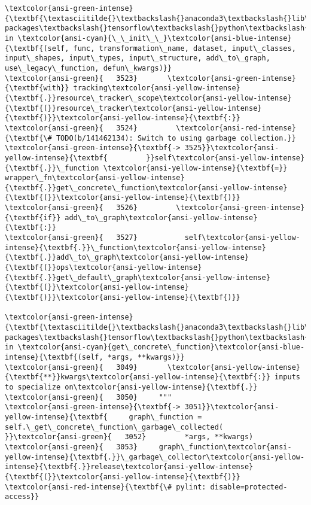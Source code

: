 \documentclass[11pt]{article}
\begin{document}
\begin{Verbatim}[commandchars=\\\{\}, frame=single, framerule=2mm, rulecolor=\color{outerrorbackground}]
\textcolor{ansi-green-intense}{\textbf{\textasciitilde{}\textbackslash{}anaconda3\textbackslash{}lib\textbackslash{}site-packages\textbackslash{}tensorflow\textbackslash{}python\textbackslash{}data\textbackslash{}ops\textbackslash{}dataset\_ops.py}} in \textcolor{ansi-cyan}{\_\_init\_\_}\textcolor{ansi-blue-intense}{\textbf{(self, func, transformation\_name, dataset, input\_classes, input\_shapes, input\_types, input\_structure, add\_to\_graph, use\_legacy\_function, defun\_kwargs)}}
\textcolor{ansi-green}{   3523}       \textcolor{ansi-green-intense}{\textbf{with}} tracking\textcolor{ansi-yellow-intense}{\textbf{.}}resource\_tracker\_scope\textcolor{ansi-yellow-intense}{\textbf{(}}resource\_tracker\textcolor{ansi-yellow-intense}{\textbf{)}}\textcolor{ansi-yellow-intense}{\textbf{:}}
\textcolor{ansi-green}{   3524}         \textcolor{ansi-red-intense}{\textbf{\# TODO(b/141462134): Switch to using garbage collection.}}
\textcolor{ansi-green-intense}{\textbf{-> 3525}}\textcolor{ansi-yellow-intense}{\textbf{         }}self\textcolor{ansi-yellow-intense}{\textbf{.}}\_function \textcolor{ansi-yellow-intense}{\textbf{=}} wrapper\_fn\textcolor{ansi-yellow-intense}{\textbf{.}}get\_concrete\_function\textcolor{ansi-yellow-intense}{\textbf{(}}\textcolor{ansi-yellow-intense}{\textbf{)}}
\textcolor{ansi-green}{   3526}         \textcolor{ansi-green-intense}{\textbf{if}} add\_to\_graph\textcolor{ansi-yellow-intense}{\textbf{:}}
\textcolor{ansi-green}{   3527}           self\textcolor{ansi-yellow-intense}{\textbf{.}}\_function\textcolor{ansi-yellow-intense}{\textbf{.}}add\_to\_graph\textcolor{ansi-yellow-intense}{\textbf{(}}ops\textcolor{ansi-yellow-intense}{\textbf{.}}get\_default\_graph\textcolor{ansi-yellow-intense}{\textbf{(}}\textcolor{ansi-yellow-intense}{\textbf{)}}\textcolor{ansi-yellow-intense}{\textbf{)}}

\textcolor{ansi-green-intense}{\textbf{\textasciitilde{}\textbackslash{}anaconda3\textbackslash{}lib\textbackslash{}site-packages\textbackslash{}tensorflow\textbackslash{}python\textbackslash{}eager\textbackslash{}function.py}} in \textcolor{ansi-cyan}{get\_concrete\_function}\textcolor{ansi-blue-intense}{\textbf{(self, *args, **kwargs)}}
\textcolor{ansi-green}{   3049}       \textcolor{ansi-yellow-intense}{\textbf{**}}kwargs\textcolor{ansi-yellow-intense}{\textbf{:}} inputs to specialize on\textcolor{ansi-yellow-intense}{\textbf{.}}
\textcolor{ansi-green}{   3050}     """
\textcolor{ansi-green-intense}{\textbf{-> 3051}}\textcolor{ansi-yellow-intense}{\textbf{     graph\_function = self.\_get\_concrete\_function\_garbage\_collected(
}}\textcolor{ansi-green}{   3052}         *args, **kwargs)
\textcolor{ansi-green}{   3053}     graph\_function\textcolor{ansi-yellow-intense}{\textbf{.}}\_garbage\_collector\textcolor{ansi-yellow-intense}{\textbf{.}}release\textcolor{ansi-yellow-intense}{\textbf{(}}\textcolor{ansi-yellow-intense}{\textbf{)}}  \textcolor{ansi-red-intense}{\textbf{\# pylint: disable=protected-access}}


\end{Verbatim}
\end{document}
